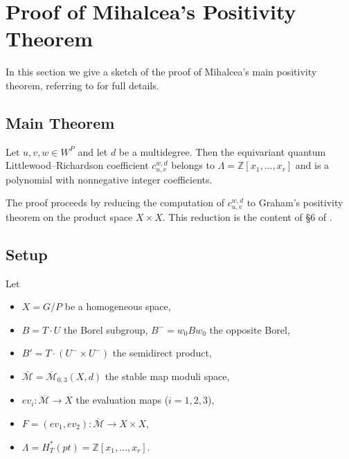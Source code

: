 
\section{Proof of Mihalcea's Positivity Theorem}
\label{sec:MihalceaProof}

In this section we give a sketch of the proof of Mihalcea's main positivity theorem,
referring to \cite[Section 6, pages 8--11]{Mihalcea} for full details.

\subsection{Main Theorem}

\begin{Theorem}
\label{th:MihalceaPositivity}
Let $u, v, w \in W^{P}$ and let $d$ be a multidegree.
Then the equivariant quantum Littlewood--Richardson coefficient
$c_{u,v}^{w,d}$ belongs to $\Lambda = \mathbb{Z}[x_{1},\ldots,x_{r}]$
and is a polynomial with nonnegative integer coefficients.
\end{Theorem}

The proof proceeds by reducing the computation of $c_{u,v}^{w,d}$ to
Graham's positivity theorem on the product space $X \times X$.
This reduction is the content of \S 6 of \cite{Mihalcea}.

\subsection{Setup}

Let
\begin{itemize}
\item $X = G/P$ be a homogeneous space,
\item $B = T \cdot U$ the Borel subgroup, $B^{-}=w_{0}Bw_{0}$ the opposite Borel,
\item $B' = T\cdot(U^{-}\times U^{-})$ the semidirect product,
\item $\overline{\mathcal{M}}=\overline{\mathcal{M}}_{0,3}(X,d)$ the stable map moduli space,
\item $ev_{i}:\overline{\mathcal{M}}\to X$ the evaluation maps ($i=1,2,3$),
\item $F=(ev_{1},ev_{2}):\overline{\mathcal{M}}\to X\times X$,
\item $\Lambda=H_{T}^{*}(pt)=\mathbb{Z}[x_{1},\ldots,x_{r}]$.
\end{itemize}

